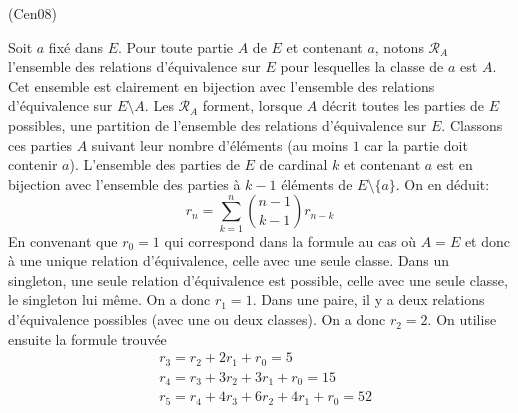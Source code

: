 \begin{tiny}(Cen08)\end{tiny} Soit $a$ fixé dans $E$. Pour toute partie $A$ de $E$ et contenant $a$, notons $\mathcal{R}_A$ l'ensemble des relations d'équivalence sur $E$ pour lesquelles la classe de $a$ est $A$. Cet ensemble est clairement en bijection avec l'ensemble des relations d'équivalence sur $E\setminus A$.\newline
Les $\mathcal{R}_A$ forment, lorsque $A$ décrit toutes les parties de $E$ possibles, une partition de l'ensemble des relations d'équivalence sur $E$.\newline 
Classons ces parties $A$ suivant leur nombre d'éléments (au moins $1$ car la partie doit contenir $a$). L'ensemble des parties de $E$ de cardinal $k$ et contenant $a$ est en bijection avec l'ensemble des parties à $k-1$ éléments de $E\setminus\{a\}$. On en déduit: 
\begin{displaymath}
 r_n = \sum_{k=1}^{n}\binom{n-1}{k-1}r_{n-k}
\end{displaymath}
En convenant que $r_0=1$ qui correspond dans la formule au cas où $A=E$ et donc à une unique relation d'équivalence, celle avec une seule classe.
Dans un singleton, une seule relation d'équivalence est possible, celle avec une seule classe, le singleton lui même. On a donc $r_1=1$.\newline
Dans une paire, il y a deux relations d'équivalence possibles (avec une ou deux classes). On a donc $r_2=2$.\newline
On utilise ensuite la formule trouvée
\begin{align*}
 &r_3 = r_2 + 2r_1 + r_0=5 \\
 &r_4 = r_3 + 3r_2 + 3r_1 +r_0= 15\\
 &r_5 = r_4+4r_3+6r_2+4r_1+r_0= 52\\
\end{align*}

